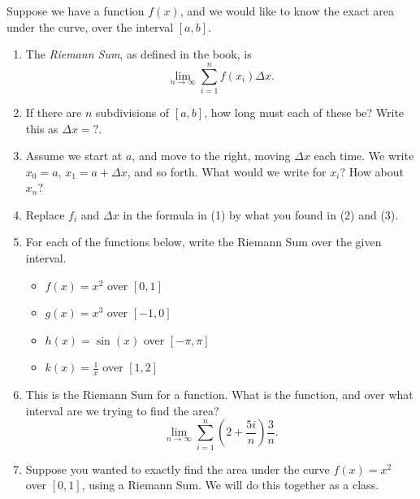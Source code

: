 \documentclass{article}
\begin{document}
Suppose we have a function $f(x)$, and we would like to know the exact area under the curve, over the interval $[a,b]$.
\begin{enumerate}
\item The \textit{Riemann Sum}, as defined in the book, is
$$\lim_{n \rightarrow \infty} \sum_{i=1}^n f(x_i) \Delta x.$$
\item If there are $n$ subdivisions of $[a,b]$, how long must each of these be? Write this as $\Delta x = ?$.
\item Assume we start at $a$, and move to the right, moving $\Delta x$ each time. We write $x_0 = a$, $x_1 = a + \Delta x$, and so forth. What would we write for $x_i$? How about $x_n$?
\item Replace $f_i$ and $\Delta x$ in the formula in (1) by what you found in (2) and (3).
\item For each of the functions below, write the Riemann Sum over the given interval.
\begin{itemize}
\item $f(x) = x^2$ over $[0,1]$
\item $g(x) = x^3$ over $[-1,0]$
\item $h(x) = \sin(x)$ over $[-\pi,\pi]$
\item $k(x) = \frac{1}{x}$ over $[1,2]$
\end{itemize}
\item This is the Riemann Sum for a function. What is the function, and over what interval are we trying to find the area?
$$\lim_{n \rightarrow \infty} \sum_{i=1}^n \left(2 + \frac{5i}{n}\right) \frac{3}{n}.$$
\item Suppose you wanted to exactly find the area under the curve $f(x) = x^2$ over $[0,1]$, using a Riemann Sum. We will do this together as a class.
\end{enumerate}
\end{document}
